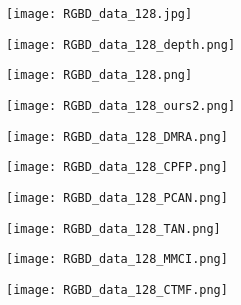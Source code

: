 \documentclass[runningheads]{llncs}
\begin{document}
\begin{figure}[t]
	\begin{subfigure}[t]{1.13cm}
		\centering
		\texttt{[image: RGBD\_data\_128.jpg]}
	\end{subfigure}
	\begin{subfigure}[t]{1.13cm}
		\centering
		\texttt{[image: RGBD\_data\_128\_depth.png]}
	\end{subfigure}
	\begin{subfigure}[t]{1.13cm}
		\centering
		\texttt{[image: RGBD\_data\_128.png]}
	\end{subfigure}
	\begin{subfigure}[t]{1.13cm}
		\centering
		\texttt{[image: RGBD\_data\_128\_ours2.png]}
	\end{subfigure}
	\begin{subfigure}[t]{1.13cm}
		\centering
		\texttt{[image: RGBD\_data\_128\_DMRA.png]}
	\end{subfigure}
	\begin{subfigure}[t]{1.13cm}
		\centering
		\texttt{[image: RGBD\_data\_128\_CPFP.png]}
	\end{subfigure}
	\begin{subfigure}[t]{1.13cm}
		\centering
		\texttt{[image: RGBD\_data\_128\_PCAN.png]}
	\end{subfigure}
	\begin{subfigure}[t]{1.13cm}
		\centering
		\texttt{[image: RGBD\_data\_128\_TAN.png]}
	\end{subfigure}
	\begin{subfigure}[t]{1.13cm}
		\centering
		\texttt{[image: RGBD\_data\_128\_MMCI.png]}
	\end{subfigure}
	\begin{subfigure}[t]{1.13cm}
		\centering
		\texttt{[image: RGBD\_data\_128\_CTMF.png]}
	\end{subfigure}
	
	\vspace{1pt}
	

\end{figure}
\end{document}
